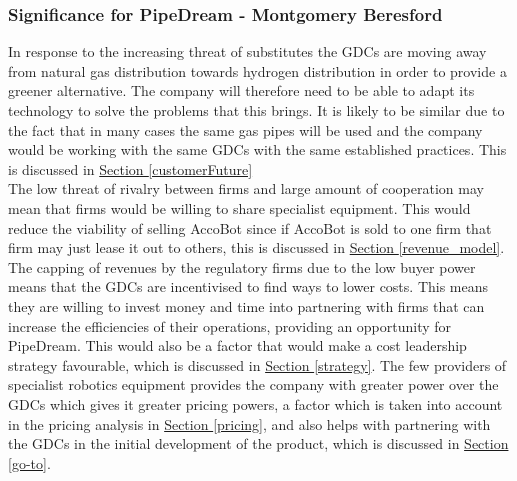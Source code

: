 \documentclass[11pt]{article}		%
\newcommand{\supercite}[1]{\textsuperscript{\cite{#1}}}		%
\newcommand{\sectref}[1]{\hyperref[#1]{Section \ref*{#1}}}     %
\begin{document}
           \subsubsection{Significance for PipeDream - Montgomery Beresford} \label{pricingpower}
           
                In response to the increasing threat of substitutes the GDCs are moving away from natural gas distribution towards hydrogen distribution in order to provide a greener alternative. The company will therefore need to be able to adapt its technology to solve the problems that this brings. It is likely to be similar due to the fact that in many cases the same gas pipes will be used and the company would be working with the same GDCs with the same established practices. This is discussed in \sectref{customerFuture}
                \\ 
                \hspace*{2ex}The low threat of rivalry between firms and large amount of cooperation may mean that firms would be willing to share specialist equipment. This would  reduce the viability of selling AccoBot since if AccoBot is sold to one firm that firm may just lease it out to others, this is discussed in \sectref{revenue_model}. 
                \\
                \hspace*{2ex}The capping of revenues by the regulatory firms due to the low buyer power means that the GDCs are incentivised to find ways to lower costs. This means they are willing to invest money and time into partnering with firms that can increase the efficiencies of their operations, providing an opportunity for PipeDream. This would also be a factor that would make a cost leadership strategy favourable, which is discussed in \sectref{strategy}.
                The few providers of specialist robotics equipment provides the company with greater power over the GDCs which gives it greater pricing powers, a factor which is taken into account in the pricing analysis in \sectref{pricing}, and also helps with partnering with the GDCs in the initial development of the product, which is discussed in \sectref{go-to}. 
       
                
\end{document}
